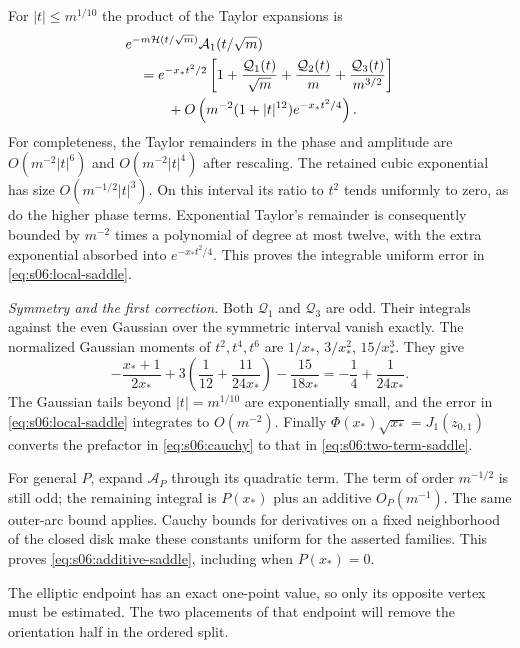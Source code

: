 \begin{prf}
For $|t|\leq m^{1/10}$ the product of the Taylor expansions is
\begin{align}
 &e^{-m\mathcal H(t/\sqrt m)}\mathcal A_1(t/\sqrt m)\notag\\
 &\quad=e^{-x_*t^2/2}
 \left[1+\frac{\mathcal Q_1(t)}{\sqrt m}
         +\frac{\mathcal Q_2(t)}m
         +\frac{\mathcal Q_3(t)}{m^{3/2}}\right]\notag\\
 &\qquad\quad
   +O\left(m^{-2}(1+|t|^{12})e^{-x_*t^2/4}\right).
 \label{eq:s06:local-saddle}
\end{align}
For completeness, the Taylor remainders in the phase and amplitude
are $O(m^{-2}|t|^6)$ and $O(m^{-2}|t|^4)$ after rescaling.
The retained cubic exponential has size
$O(m^{-1/2}|t|^3)$. On this interval its ratio to $t^2$ tends
uniformly to zero, as do the higher phase terms. Exponential
Taylor's remainder is consequently bounded by $m^{-2}$ times a
polynomial of degree at most twelve, with the extra exponential
absorbed into $e^{-x_*t^2/4}$. This proves the integrable uniform
error in \eqref{eq:s06:local-saddle}.

\emph{Symmetry and the first correction.}
Both $\mathcal Q_1$ and $\mathcal Q_3$ are odd. Their integrals
against the even Gaussian over the symmetric interval vanish
exactly. The normalized Gaussian moments of $t^2,t^4,t^6$ are
$1/x_*$, $3/x_*^2$, $15/x_*^3$. They give
\[
 -\frac{x_*+1}{2x_*}
 +3\left(\frac1{12}+\frac{11}{24x_*}\right)
 -\frac{15}{18x_*}
 =-\frac14+\frac1{24x_*}.
\]
The Gaussian tails beyond $|t|=m^{1/10}$ are exponentially small,
and the error in \eqref{eq:s06:local-saddle} integrates to
$O(m^{-2})$. Finally
$\Phi(x_*)\sqrt{x_*}=J_1(z_{0,1})$ converts the prefactor in
\eqref{eq:s06:cauchy} to that in
\eqref{eq:s06:two-term-saddle}.

For general $P$, expand $\mathcal A_P$ through its quadratic term.
The term of order $m^{-1/2}$ is still odd; the remaining integral
is $P(x_*)$ plus an additive $O_P(m^{-1})$.
The same outer-arc bound applies. Cauchy bounds for derivatives on
a fixed neighborhood of the closed disk make these constants
uniform for the asserted families. This proves
\eqref{eq:s06:additive-saddle}, including when $P(x_*)=0$.
\end{prf}

The elliptic endpoint has an exact one-point value, so only its
opposite vertex must be estimated. The two placements of that
endpoint will remove the orientation half in the ordered split.

